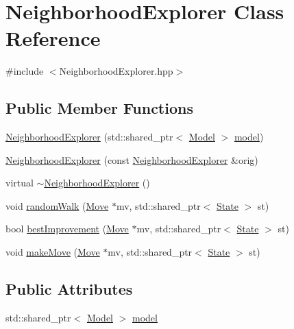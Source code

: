 \hypertarget{class_neighborhood_explorer}{\section{Neighborhood\-Explorer Class Reference}
\label{class_neighborhood_explorer}
}


{\ttfamily \#include $<$Neighborhood\-Explorer.\-hpp$>$}

\subsection*{Public Member Functions}
\begin{DoxyCompactItemize}
\item 
\hyperlink{class_neighborhood_explorer_a1d4c826b5d812cb8a6e4d8371e8b8e5a}{Neighborhood\-Explorer} (std\-::shared\-\_\-ptr$<$ \hyperlink{class_model}{Model} $>$ \hyperlink{class_neighborhood_explorer_aa4da40077758b18ef280c1fba3d9092e}{model})
\item 
\hyperlink{class_neighborhood_explorer_afe9eb7ec443d05d2f2b43695fed74b06}{Neighborhood\-Explorer} (const \hyperlink{class_neighborhood_explorer}{Neighborhood\-Explorer} \&orig)
\item 
virtual \hyperlink{class_neighborhood_explorer_a477dff82a42d89438c5b21a87874062c}{$\sim$\-Neighborhood\-Explorer} ()
\item 
void \hyperlink{class_neighborhood_explorer_a56eb7d36d136801c1d7b9e39a2f9ccfb}{random\-Walk} (\hyperlink{class_move}{Move} $\ast$mv, std\-::shared\-\_\-ptr$<$ \hyperlink{class_state}{State} $>$ st)
\item 
bool \hyperlink{class_neighborhood_explorer_a8c30c890d40d19c8c0eb1f4a3285c3b0}{best\-Improvement} (\hyperlink{class_move}{Move} $\ast$mv, std\-::shared\-\_\-ptr$<$ \hyperlink{class_state}{State} $>$ st)
\item 
void \hyperlink{class_neighborhood_explorer_adab61e4e07cb283e90ebbf9a19826969}{make\-Move} (\hyperlink{class_move}{Move} $\ast$mv, std\-::shared\-\_\-ptr$<$ \hyperlink{class_state}{State} $>$ st)
\end{DoxyCompactItemize}
\subsection*{Public Attributes}
\begin{DoxyCompactItemize}
\item 
std\-::shared\-\_\-ptr$<$ \hyperlink{class_model}{Model} $>$ \hyperlink{class_neighborhood_explorer_aa4da40077758b18ef280c1fba3d9092e}{model}
\end{DoxyCompactItemize}
